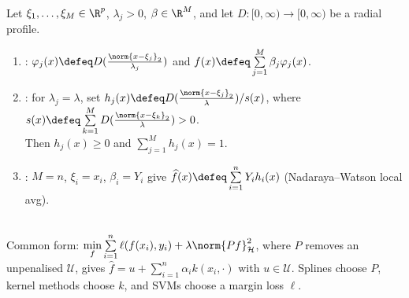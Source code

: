 \begin{example} \label{ex:sl-radial-basis-expansion} \\
Let $\xi_1,\ldots,\xi_M\in\R^p$, $\lambda_j>0$, $\beta\in\R^M$, and let $D:[0,\infty)\to[0,\infty)$ be a radial profile.
\begin{enumerate}[label=(\roman*)]
\setlength{\itemsep}{0pt}
\item {}: $\varphi_j(x)\defeq D(\frac{\norm{x-\xi_j}_2}{\lambda_j})$ and $f(x)\defeq\sum\limits_{j=1}^M\beta_j\varphi_j(x)$.
\item {}: for $\lambda_j=\lambda$, set $h_j(x)\defeq D(\frac{\norm{x-\xi_j}_2}{\lambda})/s(x)$, where $s(x)\defeq\sum\limits_{k=1}^M D(\frac{\norm{x-\xi_k}_2}{\lambda})>0$.\\
Then $h_j(x)\geq0$ and $\sum\limits_{j=1}^M h_j(x)=1$.
\item {}: $M=n$, $\xi_i=x_i$, $\beta_i=Y_i$ give $\widehat{f}(x)\defeq\sum\limits_{i=1}^nY_i h_i(x)$ (Nadaraya--Watson local avg).
\end{enumerate}
\end{example}

\begin{remark} \label{rem:sl-rkhs-regularization-spline-kernel-link} \\
Common form: $\min\limits_f\sum\limits_{i=1}^n\ell(f(x_i),y_i)+\lambda\norm{Pf}_{\mathcal{H}}^2$, where $P$ removes an unpenalised $\mathcal{U}$, gives $\widehat{f}=u+\sum\limits_{i=1}^n\alpha_i k(x_i,\cdot)$ with $u\in\mathcal{U}$. Splines choose $P$, kernel methods choose $k$, and SVMs choose a margin loss $\ell$.
\end{remark}

